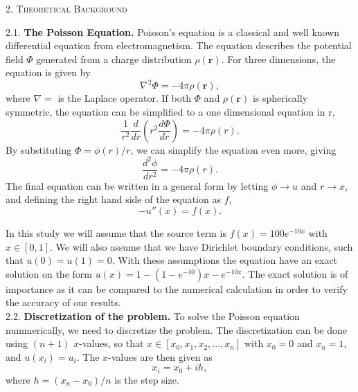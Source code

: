 \documentclass[a4paper,10pt]{article}
\newcommand{\der}[2]{\frac{d #1}{d #2}}
\newcommand{\dder}[2]{\frac{d^2 #1}{d #2 ^2}}
\begin{document}
\newpage


\begin{center}
\textsc{2. Theoretical Background}
\end{center}
2.1. \textbf{The Poisson Equation.} 
Poisson's equation is a classical and well known differential equation from electromagnetism. The equation describes the potential field $\Phi$ generated from a charge distribution $\rho(\textbf{r})$. For three dimensions, the equation is given by
\begin{equation}\label{eq:1}
 \nabla^2 \Phi = -4 \pi \rho(\textbf{r}),
\end{equation}
where $\nabla = $ is the Laplace operator. If both $\Phi$ and $\rho(\textbf{r})$ is spherically symmetric, the equation can be simplified to a one dimensional equation in r,
$$ \frac{1}{r^2}  \der{}{r} \left( r^2 \der{\Phi}{r} \right)= -4 \pi \rho(r).$$
By substituting $\Phi = \phi(r)/r$, we can simplify the equation even more, giving 
$$ \dder{\phi}{r} = -4\pi \rho(r). $$ 
The final equation can be written in a general form by letting $\phi \rightarrow u$ and $r \rightarrow x$, and defining the right hand side of the equation as $f$,
\begin{equation}\label{eq:2}
 - u''(x) = f(x).
\end{equation}

In this study we will assume that the source term is $f(x) = 100 e^{-10x}$ with $x \in [0,1]$. We will also assume that we have Dirichlet boundary conditions, such that $ u(0) = u(1) = 0. $ With these assumptions the equation have an exact solution on the form $u(x) = 1 - (1 - e^{-10})x - e^{-10x}$. The exact solution is of importance as it can be compared to the numerical calculation in order to verify the accuracy of our results.  \\



2.2. \textbf{Discretization of the problem.} 
To solve the Poisson equation nummerically, we need to discretize the problem. The discretization can be done using $(n+1)$ $x$-values, so that $x \in [x_0, x_1, x_2, ..., x_n]$ with $x_0 = 0$ and $x_n = 1$, and $u(x_i) = u_i$. The $x$-values are then given as 
$$ x_i = x_0 + ih, $$
where $h = (x_n - x_0)/n$ is the step size. \\
\end{document}
